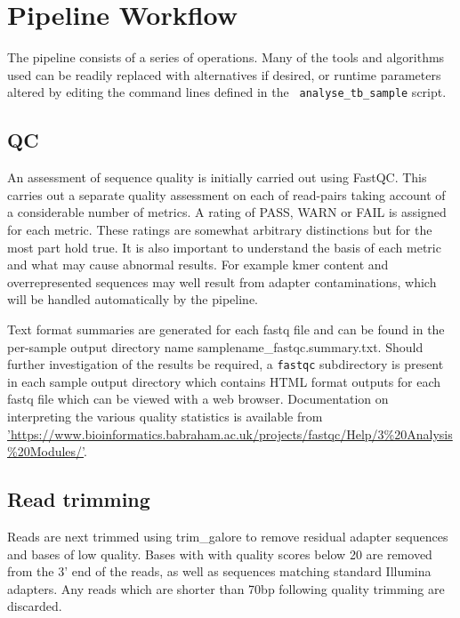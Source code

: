 \documentclass[a4paper,10pt,twoside]{article}
\begin{document}
\section{Pipeline Workflow}

The pipeline consists of a series of operations. Many of the tools and
algorithms used can be readily replaced with alternatives if desired, or
runtime parameters altered by editing the command lines defined in the {\tt
analyse\_tb\_sample} script. 

\subsection{QC}

An assessment of sequence quality is initially carried out using FastQC. This
carries out a separate quality assessment on each of read-pairs taking account
of a considerable number of metrics. A rating of PASS, WARN or FAIL is assigned
for each metric. These ratings are somewhat arbitrary distinctions but for the
most part hold true. It is also important to understand the basis of each
metric and what may cause abnormal results. For example kmer content and
overrepresented sequences may well result from adapter contaminations, which
will be handled automatically by the pipeline. 

Text format summaries are generated for each fastq file and can be found in the
per-sample output directory name samplename\_fastqc.summary.txt. Should further
investigation of the results be required, a {\tt fastqc} subdirectory is
present in each sample output directory which contains HTML format outputs for
each fastq file which can be viewed with a web browser. Documentation on
interpreting the various quality statistics is available from
\href{https://www.bioinformatics.babraham.ac.uk/projects/fastqc/Help/3\%20Analysis\%20Modules}{'https://www.bioinformatics.babraham.ac.uk/projects/fastqc/Help/3\%20Analysis\%20Modules/'}.

\subsection{Read trimming}

Reads are next trimmed using trim\_galore to remove residual adapter sequences
and bases of low quality. Bases with with quality scores below 20 are removed
from the 3' end of the reads, as well as sequences matching standard Illumina
adapters. Any reads which are shorter than 70bp following quality trimming are
discarded.
\end{document}
